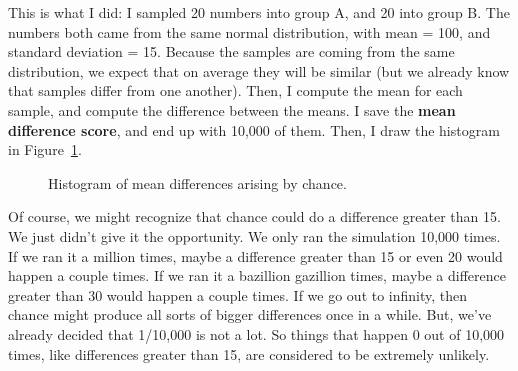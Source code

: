 \documentclass[
  letterpaper,
  DIV=11,
  numbers=noendperiod]{scrreprt}
\begin{document}
This is what I did: I sampled 20 numbers into group A, and 20 into group
B. The numbers both came from the same normal distribution, with mean =
100, and standard deviation = 15. Because the samples are coming from
the same distribution, we expect that on average they will be similar
(but we already know that samples differ from one another). Then, I
compute the mean for each sample, and compute the difference between the
means. I save the \textbf{mean difference score}, and end up with 10,000
of them. Then, I draw the histogram in Figure~\ref{fig-5crumptestdiff}.

\begin{figure}


\caption{\label{fig-5crumptestdiff}Histogram of mean differences arising
by chance.}

\end{figure}%

\begin{tcolorbox}[enhanced jigsaw, title=\textcolor{quarto-callout-note-color}{\faInfo}\hspace{0.5em}{Note}, colframe=quarto-callout-note-color-frame, colbacktitle=quarto-callout-note-color!10!white, bottomtitle=1mm, leftrule=.75mm, rightrule=.15mm, titlerule=0mm, arc=.35mm, colback=white, opacitybacktitle=0.6, toprule=.15mm, toptitle=1mm, bottomrule=.15mm, coltitle=black, breakable, left=2mm, opacityback=0]

Of course, we might recognize that chance could do a difference greater
than 15. We just didn't give it the opportunity. We only ran the
simulation 10,000 times. If we ran it a million times, maybe a
difference greater than 15 or even 20 would happen a couple times. If we
ran it a bazillion gazillion times, maybe a difference greater than 30
would happen a couple times. If we go out to infinity, then chance might
produce all sorts of bigger differences once in a while. But, we've
already decided that 1/10,000 is not a lot. So things that happen 0 out
of 10,000 times, like differences greater than 15, are considered to be
extremely unlikely.

\end{tcolorbox}
\end{document}

